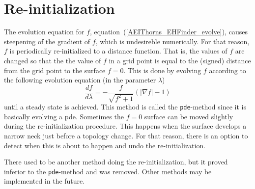 \section{Re-initialization}
\label{AEIThorns_EHFinder_re_init}
The evolution equation for $f$, 
equation~(\ref{AEIThorns_EHFinder_evolve}), causes steepening of
the gradient of $f$, which is undesireble numerically. For that reason, $f$
is periodically re-initialized to a distance function. That is, the values of
$f$ are changed so that the the value of $f$ in a grid point is equal to the
(signed) distance from the grid point to the surface $f=0$. This is done by
evolving $f$ according to the following evolution equation (in the parameter
$\lambda$)
\begin{equation}
\frac{df}{d\lambda} = -\frac{f}{\sqrt{f^{2}+1}}\left (|\nabla f|-1\right )
\label{AEIThorns_EHFinder_reinit}
\end{equation}
until a steady state is achieved. This method is called the {\tt pde}-method
since it is basically evolving a pde. Sometimes the $f=0$ surface can be
moved slightly during the re-initialization procedure. This happens when
the surface develops a narrow neck just before a topology change. For
that reason, there is an option to detect when this is about to happen and
undo the re-initialization.

There used to be another method doing the re-initialization, but it proved
inferior to the {\tt pde}-method and was removed. Other methods may be
implemented in the future.

